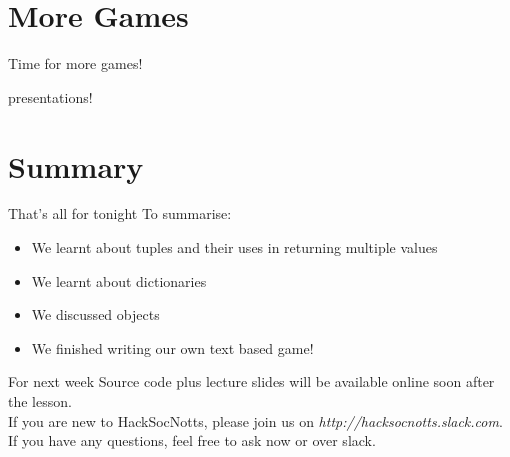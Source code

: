 \documentclass{beamer}
\begin{document}
\section{More Games}

\begin{frame}
Time for more games!
\end{frame}

\begin{frame}{presentations!}

\end{frame}

\section{Summary}

\begin{frame}{That's all for tonight}
  To summarise:
  \pause
  \begin{itemize}
  \item We learnt about tuples and their uses in returning multiple values\pause
  \item We learnt about dictionaries\pause
  \item We discussed objects\pause
  \item We finished writing our own text based game!
  \end{itemize}
\end{frame}

\begin{frame}{For next week}
Source code plus lecture slides will be available online soon after the lesson.\\
If you are new to HackSocNotts, please join us on \textit{http://hacksocnotts.slack.com}.\\
If you have any questions, feel free to ask now or over slack.\\
\end{frame}
\end{document}
